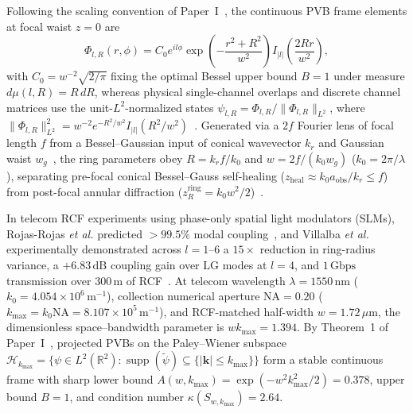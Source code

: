 \documentclass[aps,pra,reprint,nofootinbib,floatfix,longbibliography]{revtex4-2}
\newcommand{\norm}[1]{\lVert #1 \rVert}
\newcommand{\abs}[1]{\lvert #1 \rvert}
\begin{document}
Following the scaling convention of Paper~I~\cite{AyalaPaperI}, the continuous PVB frame elements at focal waist $z = 0$ are
\begin{equation}
\Phi_{l,R}(r,\phi) = C_0 e^{il\phi} \exp\!\left(-\frac{r^2 + R^2}{w^2}\right) I_{\abs{l}}\!\left(\frac{2Rr}{w^2}\right),
\label{eq:pvb_frame_def}
\end{equation}
with $C_0 = w^{-2}\sqrt{2/\pi}$ fixing the optimal Bessel upper bound $B = 1$ under measure $d\mu(l,R) = R\,dR$, whereas physical single-channel overlaps and discrete channel matrices use the unit-$L^2$-normalized states $\psi_{l,R} = \Phi_{l,R}/\norm{\Phi_{l,R}}_{L^2}$, where $\norm{\Phi_{l,R}}_{L^2}^2 = w^{-2} e^{-R^2/w^2} I_{\abs{l}}(R^2/w^2)$~\cite{Gradshteyn2014}. Generated via a $2f$ Fourier lens of focal length $f$ from a Bessel--Gaussian input of conical wavevector $k_r$ and Gaussian waist $w_g$~\cite{Vaity2015,Gori1987}, the ring parameters obey $R = k_r f/k_0$ and $w = 2f/(k_0 w_g)$ ($k_0 = 2\pi/\lambda$), separating pre-focal conical Bessel--Gauss self-healing ($z_{\mathrm{heal}} \approx k_0 a_{\mathrm{obs}}/k_r \le f$) from post-focal annular diffraction ($z_R^{\mathrm{ring}} = k_0 w^2/2$)~\cite{Reddy2016,AyalaPaperI}.

In telecom RCF experiments using phase-only spatial light modulators (SLMs), Rojas-Rojas \emph{et al.} predicted $>99.5\%$ modal coupling~\cite{RojasRojas2021}, and Villalba \emph{et al.} experimentally demonstrated across $l = 1\text{--}6$ a $15\times$ reduction in ring-radius variance, a $+6.83\,\mathrm{dB}$ coupling gain over $\mathrm{LG}$ modes at $l = 4$, and $1\,\mathrm{Gbps}$ transmission over $300\,\mathrm{m}$ of RCF~\cite{Villalba2023}. At telecom wavelength $\lambda = 1550\,\mathrm{nm}$ ($k_0 = 4.054\times 10^6\,\mathrm{m}^{-1}$), collection numerical aperture $\mathrm{NA} = 0.20$ ($k_{\max} = k_0\mathrm{NA} = 8.107\times 10^5\,\mathrm{m}^{-1}$), and RCF-matched half-width $w = 1.72\,\mu\mathrm{m}$, the dimensionless space--bandwidth parameter is $w k_{\max} = 1.394$. By Theorem~1 of Paper~I~\cite{AyalaPaperI}, projected PVBs on the Paley--Wiener subspace $\mathcal{H}_{k_{\max}} = \{\psi \in L^2(\mathbb{R}^2) : \operatorname{supp}(\widetilde{\psi}) \subseteq \{\abs{\mathbf{k}} \le k_{\max}\}\}$ form a stable continuous frame with sharp lower bound $A(w,k_{\max}) = \exp(-w^2 k_{\max}^2/2) = 0.378$, upper bound $B = 1$, and condition number $\kappa(S_{w,k_{\max}}) = 2.64$.
\end{document}
